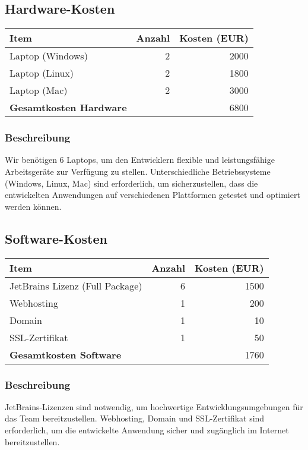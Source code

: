\subsection*{Hardware-Kosten}
\begin{tabular}{lrr}
  \toprule
  \textbf{Item} & \textbf{Anzahl} & \textbf{Kosten (EUR)} \\
  \midrule
  Laptop (Windows) & 2 & 2000 \\
  Laptop (Linux) & 2 & 1800 \\
  Laptop (Mac) & 2 & 3000 \\
  \midrule
  \textbf{Gesamtkosten Hardware} & & 6800 \\
  \bottomrule
\end{tabular}

\subsubsection*{Beschreibung}
Wir benötigen 6 Laptops, um den Entwicklern flexible und leistungsfähige Arbeitsgeräte zur Verfügung zu stellen. Unterschiedliche Betriebssysteme (Windows, Linux, Mac) sind erforderlich, um sicherzustellen, dass die entwickelten Anwendungen auf verschiedenen Plattformen getestet und optimiert werden können.

\subsection*{Software-Kosten}
\begin{tabular}{lrr}
  \toprule
  \textbf{Item} & \textbf{Anzahl} & \textbf{Kosten (EUR)} \\
  \midrule
  JetBrains Lizenz (Full Package) & 6 & 1500 \\
  Webhosting & 1 & 200 \\
  Domain & 1 & 10 \\
  SSL-Zertifikat & 1 & 50 \\
  \midrule
  \textbf{Gesamtkosten Software} & & 1760 \\
  \bottomrule
\end{tabular}

\subsubsection*{Beschreibung}
JetBrains-Lizenzen sind notwendig, um hochwertige Entwicklungsumgebungen für das Team bereitzustellen. Webhosting, Domain und SSL-Zertifikat sind erforderlich, um die entwickelte Anwendung sicher und zugänglich im Internet bereitzustellen.

